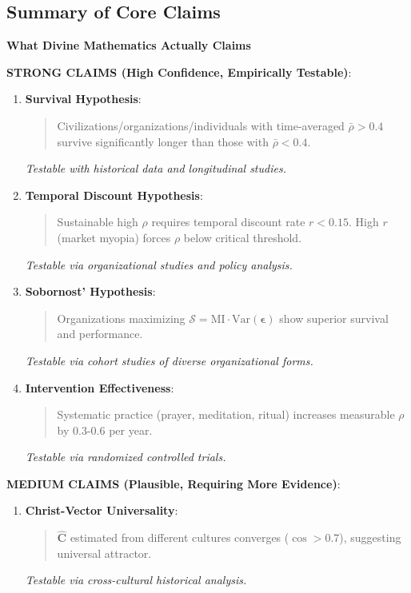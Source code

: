 \documentclass[11pt,a4paper]{article}
\theoremstyle{definition}
\theoremstyle{remark}
\begin{document}
\begin{enumerate}
\begin{protocol}
\subsection{Summary of Core Claims}

\begin{mdframed}[backgroundcolor=yellow!10,linewidth=2pt]
\textbf{What Divine Mathematics Actually Claims}

\textbf{STRONG CLAIMS (High Confidence, Empirically Testable)}:

\begin{enumerate}
    \item \textbf{Survival Hypothesis}: 
        \begin{quote}
        Civilizations/organizations/individuals with time-averaged \(\bar{\rho} > 0.4\) survive significantly longer than those with \(\bar{\rho} < 0.4\).
        \end{quote}
        \textit{Testable with historical data and longitudinal studies.}
    
    \item \textbf{Temporal Discount Hypothesis}:
        \begin{quote}
        Sustainable high \(\rho\) requires temporal discount rate \(r < 0.15\). High \(r\) (market myopia) forces \(\rho\) below critical threshold.
        \end{quote}
        \textit{Testable via organizational studies and policy analysis.}
    
    \item \textbf{Sobornost' Hypothesis}:
        \begin{quote}
        Organizations maximizing \(\mathcal{S} = \text{MI} \cdot \text{Var}(\boldsymbol{\epsilon})\) show superior survival and performance.
        \end{quote}
        \textit{Testable via cohort studies of diverse organizational forms.}
    
    \item \textbf{Intervention Effectiveness}:
        \begin{quote}
        Systematic practice (prayer, meditation, ritual) increases measurable \(\rho\) by 0.3-0.6 per year.
        \end{quote}
        \textit{Testable via randomized controlled trials.}
\end{enumerate}

\textbf{MEDIUM CLAIMS (Plausible, Requiring More Evidence)}:

\begin{enumerate}
    \item \textbf{Christ-Vector Universality}:
        \begin{quote}
        \(\hat{\mathbf{C}}\) estimated from different cultures converges (\(\cos > 0.7\)), suggesting universal attractor.
        \end{quote}
        \textit{Testable via cross-cultural historical analysis.}
    

\end{enumerate}
\end{mdframed}
\end{protocol}
\end{enumerate}
\end{document}
